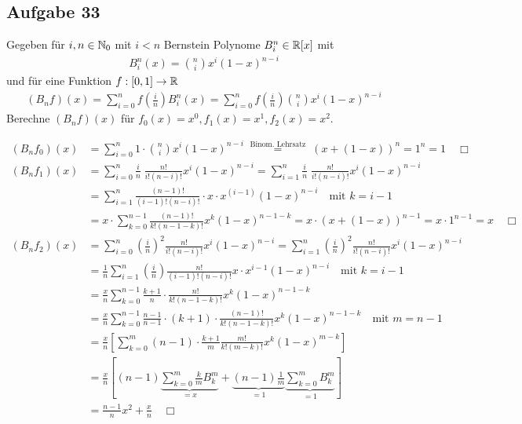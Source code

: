 \subsection*{Aufgabe 33}
Gegeben für $i, n \in \mathbb N_0$ mit $i < n$ Bernstein Polynome $B_i^n \in \mathbb R[x]$ mit
\begin{align}
  B_i^n(x) = \binom{n}{i} x^i(1 - x)^{n-i}
\end{align}
und für eine Funktion $f: [0,1] \rightarrow \mathbb R$
\begin{align}
  (B_n f)(x) = \sum_{i = 0}^n f\left(\frac{i}{n}\right) B_i^n(x) =
  \sum_{i = 0}^n f\left(\frac{i}{n}\right) \binom{n}{i} x^i(1 - x)^{n-i}
\end{align}
Berechne $(B_n f)(x)$ für $f_0(x) = x^0, f_1(x) = x^1, f_2(x) = x^2$.

\begin{align*}
  (B_n f_0)(x) &= \sum_{i = 0}^n 1 \cdot \binom{n}{i} x^i(1 - x)^{n-i}
    \; \overset{\text{Binom. Lehrsatz}}{=} \; \left( x + (1 -x) \right)^n = 1^n = 1 \quad \Box\\
  (B_n f_1)(x) &= \sum_{i = 0}^n \frac{i}{n} \; \frac{n!}{i! (n-i)!} x^i(1 - x)^{n-i} =
    \sum_{i = 1}^n \frac{i}{n} \; \frac{n!}{i! (n-i)!} x^i(1 - x)^{n-i} \\
    & = \sum_{i = 1}^n \frac{(n-1)!}{(i-1)! (n-i)!} \cdot x \cdot x^{(i-1)}(1 - x)^{n-i}
    \quad \text{mit $k = i - 1$} \\
    & = x  \cdot \sum_{k = 0}^{n-1} \frac{(n-1)!}{k! (n-1-k)!} x^k(1 - x)^{n-1-k}
    = x \cdot \left( x + (1 -x) \right)^{n-1} = x \cdot 1^{n-1} = x  \quad \Box
\end{align*}
\begin{align*}
  (B_n f_2)(x) &= \sum_{i = 0}^n \left(\frac{i}{n}\right)^2 \frac{n!}{i! (n-i)!} x^i(1 - x)^{n-i} =
    \sum_{i = 1}^n \left(\frac{i}{n}\right)^2 \frac{n!}{i! (n-i)!} x^i(1 - x)^{n-i} \\
  & = \frac{1}{n} \sum_{i = 1}^n \left(\frac{i}{n}\right) \frac{n!}{(i-1)! (n-i)!} x \cdot x^{i-1}(1 - x)^{n-i}
  \quad \text{mit $k = i - 1$} \\
   & = \frac{x}{n} \sum_{k = 0}^{n-1} \frac{k+1}{n} \cdot \frac{n!}{k! (n-1-k)!} x^{k}(1 - x)^{n -1-k}\\
   & = \frac{x}{n} \sum_{k = 0}^{n-1} \frac{n-1}{n-1} \cdot (k+1) \cdot \frac{(n-1)!}{k! (n-1-k)!} x^{k}(1 - x)^{n -1-k}\quad \text{mit $m = n - 1$} \\
   & = \frac{x}{n} \left[\sum_{k = 0}^{m} (n-1) \cdot \frac{k+1}{m} \frac{m!}{k! (m-k)!} x^{k}(1 - x)^{m-k} \right]\\
   & = \frac{x}{n} \left[(n-1) \underbrace{\sum_{k = 0}^{m} \frac{k}{m} B_k^m}_{= x} +
   \underbrace{(n-1)\frac{1}{m}}_{= 1} \underbrace{\sum_{k = 0}^{m} B_k^m}_{= 1}\right]\\
   & = \frac{n-1}{n} x^2   + \frac{x}{n} \quad \Box
\end{align*}

